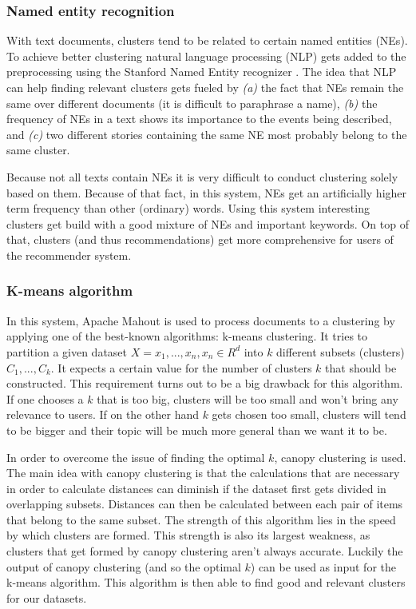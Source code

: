\documentclass[twocolumn]{phdsymp} %
\begin{document}
\subsubsection{Named entity recognition}
With text documents, clusters tend to be related to certain named entities (NEs). To achieve better clustering natural language processing (NLP) gets added to the preprocessing using the Stanford Named Entity recognizer \cite{Manning2014} \cite{Montalvo2015}. The idea that NLP can help finding relevant clusters gets fueled by \textit{(a)} the fact that NEs remain the same over different documents (it is difficult to paraphrase a name),\textit{ (b)} the frequency of NEs in a text shows its importance to the events being described, and \textit{(c)} two different stories containing the same NE most probably belong to the same cluster. 

Because not all texts contain NEs it is very difficult to conduct clustering solely based on them. Because of that fact, in this system, NEs get an artificially higher term frequency than other (ordinary) words. Using this system interesting clusters get build with a good mixture of NEs and important keywords. On top of that, clusters (and thus recommendations) get more comprehensive for users of the recommender system.

\subsubsection{K-means algorithm}

In this system, Apache Mahout is used to process documents to a clustering by applying one of the best-known algorithms: k-means clustering. It tries to partition a given dataset $X = {x_1,...,x_n}, x_n \in R^d$ into $k$ different subsets (clusters) $C_1,...,C_k$. It expects a certain value for the number of clusters $k$ that should be constructed. This requirement turns out to be a big drawback for this algorithm. If one chooses a $k$ that is too big, clusters will be too small and won't bring any relevance to users. If on the other hand $k$ gets chosen too small, clusters will tend to be bigger and their topic will be much more general than we want it to be.

In order to overcome the issue of finding the optimal $k$, canopy clustering is used. The main idea with canopy clustering is that the calculations that are necessary in order to calculate distances can diminish if the dataset first gets divided in overlapping subsets. Distances can then be calculated between each pair of items that belong to the same subset. The strength of this algorithm lies in the speed by which clusters are formed. This strength is also its largest weakness, as clusters that get formed by canopy clustering aren't always accurate. Luckily the output of canopy clustering (and so the optimal $k$) can be used as input for the k-means algorithm. This algorithm is then able to find good and relevant clusters for our datasets.
\end{document}
